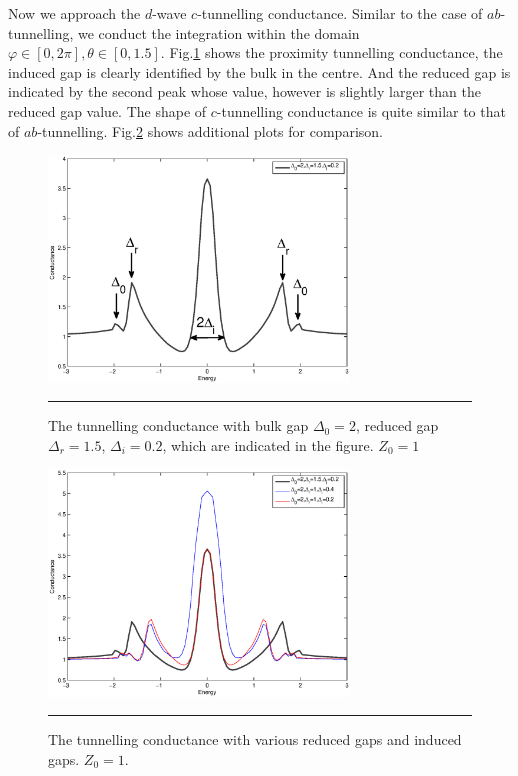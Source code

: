 Now we approach the $d$-wave $c$-tunnelling conductance. Similar to the case of $ab$-tunnelling, we conduct the integration within the domain $\varphi\in[0,2\pi], \theta\in[0,1.5]$. Fig.\ref{dcnewsingle} shows the proximity tunnelling conductance, the induced gap is clearly identified by the bulk in the centre. And the reduced gap is indicated by the second peak whose value, however is slightly larger than the reduced gap value. The shape of $c$-tunnelling conductance is quite similar to that of $ab$-tunnelling. Fig.\ref{dcnewfull} shows additional plots for comparison.
\begin{figure}[htbp]
\small
	\centering
		\includegraphics[width=8cm]{./Figures/dcnewsingle.eps}
		\rule{35em}{0.5pt}
	\caption[An Electron]{The tunnelling conductance with bulk gap $\Delta_0=2$, reduced gap $\Delta_r=1.5$, $\Delta_i=0.2$, which are indicated in the figure. $Z_0=1$}
	\label{dcnewsingle}
\end{figure}
\begin{figure}[htbp]
\small
	\centering
		\includegraphics[width=8cm]{./Figures/dcnewfull.eps}
		\rule{35em}{0.5pt}
	\caption[An Electron]{The tunnelling conductance with various reduced gaps and induced gaps. $Z_0=1$.}
	\label{dcnewfull}
\end{figure}


























